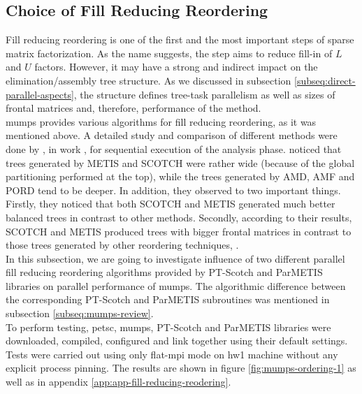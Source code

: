 \subsection{Choice of Fill Reducing Reordering}
\label{subseq:fill-in-reordering}

Fill reducing reordering is one of the first and the most important steps of sparse matrix factorization. As the name suggests, the step aims to reduce fill-in of $L$ and $U$ factors. However, it may have a strong and indirect impact on the elimination/assembly tree structure. As we discussed in subsection \ref{subseq:direct-parallel-aspects}, the structure defines tree-task parallelism as well as sizes of frontal matrices and, therefore, performance of the method.\\


\gls{mumps} provides various algorithms for fill reducing reordering, as it was mentioned above. A detailed study and comparison of different methods were done by \citeauthor{guermouche2003memory}, in work \cite{guermouche2003memory}, for sequential execution of the analysis phase. \citeauthor{guermouche2003memory} noticed that  trees generated by METIS and SCOTCH were rather wide (because of the global partitioning performed at the top), while the trees generated by AMD, AMF and PORD tend to be deeper. In addition, they observed to two important things. Firstly, they noticed that both SCOTCH and METIS generated much better balanced trees in contrast to other methods. Secondly, according to their results, SCOTCH and METIS produced trees with bigger frontal matrices in contrast to those trees generated by other reordering techniques, \cite{guermouche2003memory}.\\


In this subsection, we are going to investigate influence of two different parallel fill reducing reordering algorithms provided by PT-Scotch and ParMETIS libraries on parallel performance of \gls{mumps}. The algorithmic difference between the corresponding PT-Scotch and ParMETIS subroutines was mentioned in subsection \ref{subseq:mumps-review}.\\


To perform testing, \gls{petsc}, \gls{mumps}, PT-Scotch and ParMETIS libraries were downloaded, compiled, configured and link together using their default settings. Tests were carried out using only flat-\gls{mpi} mode on \gls{hw1} machine without any explicit process pinning. The results are shown in figure \ref{fig:mumps-ordering-1} as well as in appendix \ref{app:app-fill-reducing-reodering}.\\


